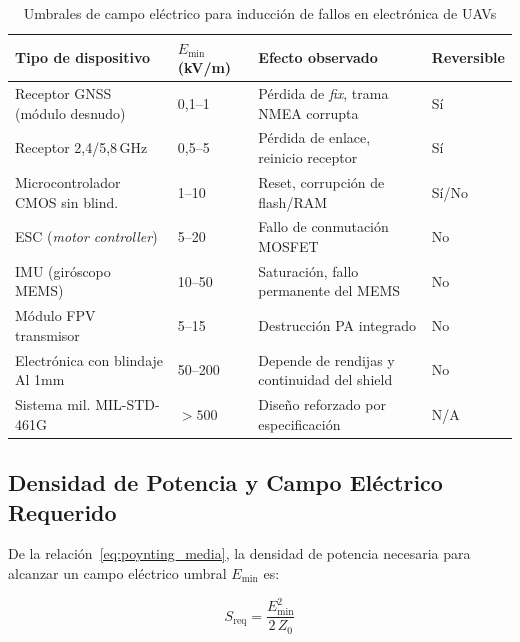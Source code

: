 \documentclass[12pt,a4paper]{article}
\begin{document}
\begin{table}[H]
\centering
\caption{Umbrales de campo eléctrico para inducción de fallos en electrónica de UAVs}
\label{tab:umbrales}
\renewcommand{\arraystretch}{1.3}
\begin{tabularx}{\textwidth}{lXXl}
\toprule
\textbf{Tipo de dispositivo} &
\textbf{$E_\mathrm{min}$ (kV/m)} &
\textbf{Efecto observado} &
\textbf{Reversible} \\
\midrule
Receptor GNSS (módulo desnudo)  & 0,1–1   & Pérdida de \textit{fix}, trama NMEA corrupta & Sí \\
Receptor 2,4/5,8\,GHz          & 0,5–5   & Pérdida de enlace, reinicio receptor          & Sí \\
Microcontrolador CMOS sin blind.& 1–10    & Reset, corrupción de flash/RAM                & Sí/No \\
ESC (\textit{motor controller}) & 5–20    & Fallo de conmutación MOSFET                   & No \\
IMU (giróscopo MEMS)            & 10–50   & Saturación, fallo permanente del MEMS         & No \\
Módulo FPV transmisor           & 5–15    & Destrucción PA integrado                      & No \\
Electrónica con blindaje Al 1mm & 50–200  & Depende de rendijas y continuidad del shield  & No \\
Sistema mil. MIL-STD-461G       & ${>}500$& Diseño reforzado por especificación           & N/A \\
\bottomrule
\end{tabularx}
\end{table}

\subsection{Densidad de Potencia y Campo Eléctrico Requerido}

De la relación~\eqref{eq:poynting_media}, la densidad de potencia necesaria
para alcanzar un campo eléctrico umbral $E_\mathrm{min}$ es:

\begin{equation}
  S_\mathrm{req} = \frac{E_\mathrm{min}^2}{2\,Z_0}
  \label{eq:s_req}
\end{equation}
\end{document}
